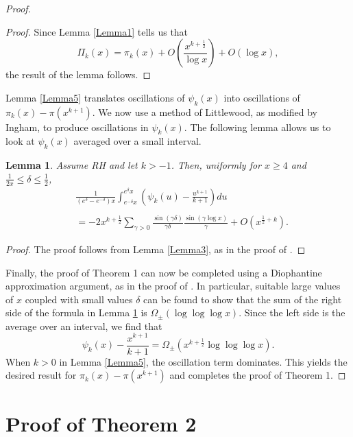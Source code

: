 \documentclass[12pt]{amsart}
\newtheorem{lemma}{Lemma}
\begin{document}
\begin{proof}
\begin{proof}
Since Lemma \ref{Lemma1} tells us that
$$
\Pi_k(x) =  \pi_k(x) + O\left(\frac{x^{k+\frac12}}{\log x}\right) + O(\log x),
$$
the result of the lemma follows.
\end{proof}

Lemma \ref{Lemma5} translates oscillations of $\psi_k(x)$ into oscillations of $\pi_k(x) - \pi(x^{k+1})$. We now use a method of Littlewood, as modified by Ingham, to produce oscillations in $\psi_k(x)$.
The following lemma allows us to look at $\psi_k(x)$ averaged over a small interval. 

\begin{lemma}\label{Lemma6} Assume RH and let $k>-1$.  Then, uniformly for $x\ge 4$ and $\frac{1}{2x} \le \delta\le \frac12$, 
\begin{align*}
&\frac{1}{(e^{\delta} - e^{-\delta})x} \int_{e^{-\delta}x}^{e^{\delta}x} \left(\psi_k(u) - \frac{u^{k+1}}{k+1}\right) du \\  \\
&= -2x^{k+\frac12} \sum_{\gamma > 0} \frac{\sin(\gamma\delta)}{\gamma\delta}
\frac{\sin(\gamma \log x)}{\gamma} + O(x^{\frac12 + k}).
\end{align*}
\end{lemma}
\begin{proof} The proof follows from Lemma \ref{Lemma3}, as in the proof of  \cite[Lemma 15.9]{MV}. \end{proof}

Finally, the proof of Theorem 1 can now be completed using a Diophantine approximation argument, as in the proof of 
\cite[Theorem 15.11]{MV}. In particular,  suitable large values of $x$ coupled with small values  $\delta$ can be found to show that the sum of the right side of the formula in Lemma \ref{Lemma6} is $\Omega_{\pm}(\log\log\log x)$.
Since the left side is the average over an interval, we find that 
$$
\psi_k(x) - \frac{x^{k+1}}{k+1} = \Omega_{\pm} \left( x^{k+\frac12}\log\log\log x\right).
$$
When $k>0$ in Lemma \ref{Lemma5}, the oscillation term dominates. This  yields the desired result for $\pi_k(x) - \pi(x^{k+1})$ and completes the proof of Theorem 1. \end{proof}


\section{Proof of Theorem 2}
\end{document}
